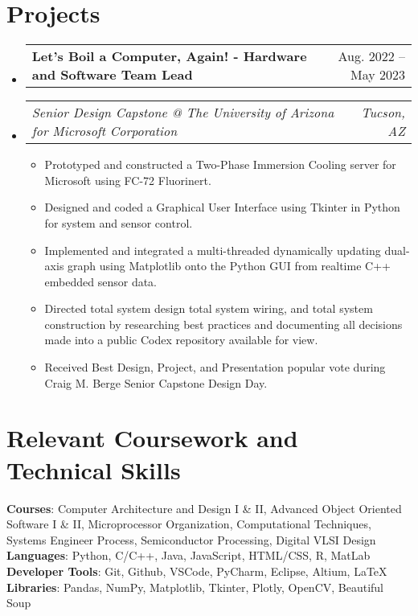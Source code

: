 \documentclass[letterpaper,11pt]{article}
\makeatletter
\newcommand{\resumeItem}[1]{
  \item\small{
    {#1 \vspace{-2pt}}
  }
}
\newcommand{\resumeSubSubheading}[2]{
    \item
    \begin{tabular*}{0.97\textwidth}{l@{\extracolsep{\fill}}r}
      \textit{\small#1} & \textit{\small #2} \\
    \end{tabular*}\vspace{-7pt}
}
\newcommand{\resumeProjectHeading}[2]{
    \item
    \begin{tabular*}{0.97\textwidth}{l@{\extracolsep{\fill}}r}
      \small#1 & #2 \\
    \end{tabular*}\vspace{-7pt}
}
\newcommand{\resumeSubHeadingListStart}{\begin{itemize}[leftmargin=0.15in, label={}]}
\newcommand{\resumeSubHeadingListEnd}{\end{itemize}}
\newcommand{\resumeItemListStart}{\begin{itemize}}
\newcommand{\resumeItemListEnd}{\end{itemize}\vspace{-5pt}}
\makeatother
\begin{document}
\section{Projects}
    \resumeSubHeadingListStart
      \resumeProjectHeading
          {\textbf{Let's Boil a Computer, Again! - Hardware and Software Team Lead} }{Aug. 2022 -- May 2023}
          \resumeSubSubheading{Senior Design Capstone @ The University of Arizona for Microsoft Corporation}{Tucson, AZ}
          \resumeItemListStart
            \resumeItem{Prototyped and constructed a Two-Phase Immersion Cooling server for Microsoft using FC-72 Fluorinert.}
            \resumeItem{Designed and coded a Graphical User Interface using Tkinter in Python for system and sensor control.}
            \resumeItem{Implemented and integrated a multi-threaded dynamically updating dual-axis graph using Matplotlib onto the Python GUI from realtime C++ embedded sensor data.}
            \resumeItem{Directed total system design total system wiring, and total system construction by researching best practices and documenting all decisions made into a public Codex repository available for view.}
            \resumeItem{Received Best Design, Project, and Presentation popular vote during Craig M. Berge Senior Capstone Design Day.}
          \resumeItemListEnd
    \resumeSubHeadingListEnd

\section{Relevant Coursework and Technical Skills}
 \begin{itemize}[leftmargin=0.22in, label={}]
    \small{\item{
      \textbf{Courses}{: Computer Architecture and Design I \& II, Advanced Object Oriented Software I \& II, 
      Microprocessor Organization,  Computational Techniques, Systems Engineer Process, Semiconductor Processing, Digital VLSI Design} \\
     \textbf{Languages}{: Python, C/C++, Java, JavaScript, HTML/CSS, R, MatLab} \\
     \textbf{Developer Tools}{: Git, Github, VSCode, PyCharm, Eclipse, Altium, LaTeX} \\
     \textbf{Libraries}{: Pandas, NumPy, Matplotlib, Tkinter, Plotly, OpenCV, Beautiful Soup}
    }}
 \end{itemize}


\end{document}
